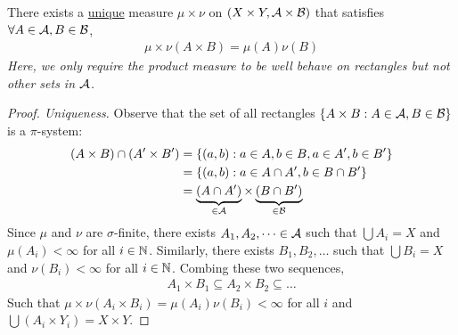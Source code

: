 \documentclass[11pt]{article}
\begin{document}
	\begin{theorem}
		There exists a \ul{unique} measure $\mu \times \nu$ on $(X \times Y, \mathcal{{A}} \times \mathcal{{B}})$ that satisfies $\forall A \in \mathcal{{A}}, B \in \mathcal{{B}}$,
		\begin{align}
			\mu \times \nu(A \times B) = \mu(A) \nu(B)
		\end{align}
		\emph{Here, we only require the product measure to be well behave on rectangles but not other sets in $\mathcal{{A}}$.}
		\begin{proof}[Proof. Uniqueness]
			Observe that the set of all rectangles $\{A \times B : A \in \mathcal{{A}}, B \in \mathcal{{B}}\}$ is a $\pi$-system:
			\begin{align}
				(A\times B) \cap (A' \times B') &= \{(a, b) : a \in A, b \in B, a \in A', b \in B'\} \\
				&= \{(a, b) : a \in A \cap A', b \in B \cap B'\} \\
				&= \underbrace{(A \cap A')}_{\in \mathcal{{A}}} \times \underbrace{(B \cap B')}_{\in \mathcal{{B}}}
			\end{align}
			Since $\mu$ and $\nu$ are $\sigma$-finite, there exists $A_1, A_2, \dots \in \mathcal{{A}}$ such that $\bigcup A_i = X$ and $\mu(A_i) < \infty$ for all $i \in \mathbb{N}$.
			Similarly, there exists $B_1, B_2, \dots$ such that  $\bigcup B_i = X$ and $\nu(B_i) < \infty$ for all $i \in \mathbb{N}$.
			Combing these two sequences,
			\begin{align}
				A_1 \times B_1 \subseteq A_2 \times B_2 \subseteq \dots
			\end{align}
			Such that $\mu \times \nu(A_i \times B_i) = \mu(A_i) \nu(B_i) < \infty$ for all $i$ and $\bigcup (A_i \times Y_i) = X \times Y$.
			

\end{proof}
\end{theorem}
\end{document}
